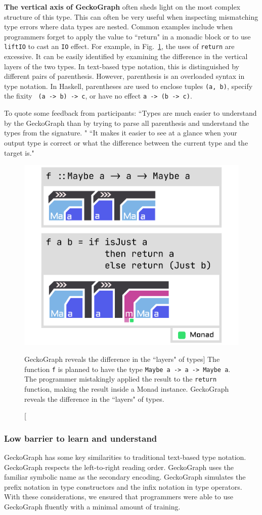 \textbf{The vertical axis of GeckoGraph} often sheds light on the most complex structure of this type. This can often be very useful when inspecting mismatching type errors where data types are nested. Common examples include when programmers forget to apply the value to ``return" in a monadic block or to use \texttt{liftIO} to cast an \texttt{IO} effect. For example, in Fig.~\ref{fig:maybe}, the uses of \texttt{return} are excessive. It can be easily identified by examining the difference in the vertical layers of the two types. In text-based type notation, this is distinguished by different pairs of parenthesis. However, parenthesis is an overloaded syntax in type notation. In Haskell, parentheses are used to enclose tuples \texttt{(a, b)}, specify the fixity \texttt{ (a -> b) -> c}, or have no effect \texttt{a -> (b -> c)}.

To quote some feedback from participants: ``Types are much easier to understand by the GeckoGraph than by trying to parse all parenthesis and understand the types from the signature. " ``It makes it easier to see at a glance when your output type is correct or what the difference between the current type and the target is."
	
\begin{figure}[hbt]
  \includegraphics[width=0.6\linewidth]{figures/Maybe}
  \caption[GeckoGraph reveals the difference in the ``layers" of types]{\label{fig:maybe} The function \texttt{f} is planned to have the type \texttt{Maybe a -> a -> Maybe a}. The programmer mistakingly applied the result to the \texttt{return} function, making the result inside a Monad instance.  GeckoGraph reveals the difference in the ``layers" of types. }
\end{figure}


\subsubsection{Low barrier to learn and understand}
GeckoGraph has some key similarities to traditional text-based type notation. GeckoGraph respects the left-to-right reading order. GeckoGraph uses the familiar symbolic name as the secondary encoding. GeckoGraph simulates the prefix notation in type constructors and the infix notation in type operators. With these considerations, we ensured that programmers were able to use GeckoGraph fluently with a minimal amount of training. 

